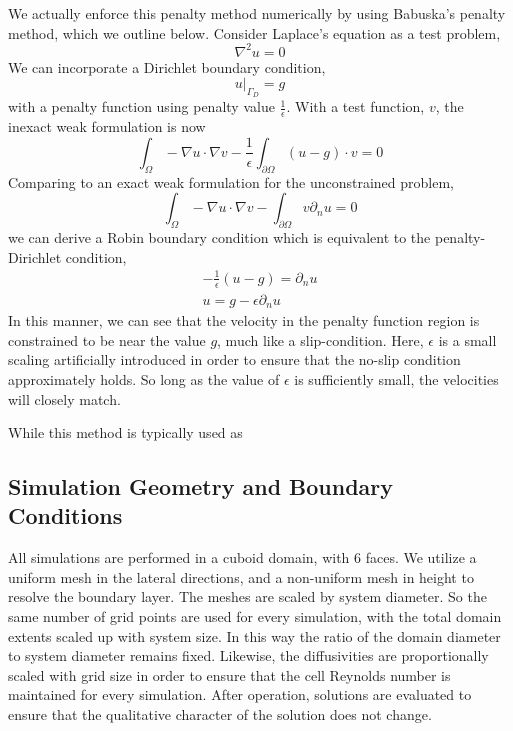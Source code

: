 We actually enforce this penalty method numerically by using Babuska's
penalty method\cite{1973fempen}, which we outline below. 
Consider Laplace's equation as a test problem, 
\begin{equation}
 \nabla^2 u = 0 
\end{equation}
We can incorporate a Dirichlet boundary condition, 
\begin{equation}
 u|_{\Gamma_D} = g
\end{equation}
with a penalty function using penalty value $\frac{1}{\epsilon}$.
With a test function, $v$, the inexact weak formulation is now
\begin{equation}
\int_{\Omega}  - \nabla u \cdot \nabla v - \frac{1}{\epsilon}
 \int_{\partial \Omega} (u-g) \cdot v = 0 
\end{equation}
Comparing to an exact weak formulation for the unconstrained problem, 
\begin{equation}
\int_{\Omega}  - \nabla u \cdot \nabla v - 
 \int_{\partial \Omega} v \partial_n u = 0 
\end{equation}
we can derive a Robin boundary condition which is equivalent to the
penalty-Dirichlet condition,
\begin{align}
-\frac{1}{\epsilon}(u-g) = \partial_n u \\
 u = g - \epsilon \partial_n u 
\end{align}
In this manner, we can see that the velocity in the penalty function
region is constrained to be near the value $g$, much like a
slip-condition. Here, $\epsilon$ is a small
scaling artificially introduced in order to ensure that the no-slip
condition approximately holds. So long as the value of $\epsilon$ is
sufficiently small, the velocities will closely match. 

While this method is typically used as 

\subsection{Simulation Geometry and Boundary Conditions}
\label{sec:bc}
%
%


All simulations are performed in a cuboid domain, with 6 faces. We
utilize a uniform mesh in the lateral directions, and a non-uniform mesh
in height to resolve the boundary layer. The meshes are scaled by system
diameter. So the same number of grid points are used for every
simulation, with the total domain extents scaled up with system size. In
this way the ratio of the domain diameter to system diameter remains
fixed. Likewise, the diffusivities are proportionally scaled with grid
size in order to ensure that the cell Reynolds number is maintained for
every simulation. After operation, solutions are evaluated to ensure
that the qualitative character of the solution does not change. 


